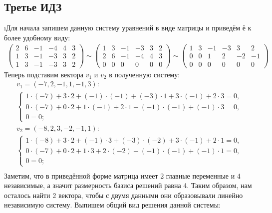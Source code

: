 \subsection{Третье ИДЗ}

\i Для начала запишем данную систему уравнений в виде матрицы и приведём ё к более удобному виду:
\begin{gather*}
    \begin{pmatrix}
        2 & 6 & -1 & -4 & 4 & 3 \\
        1 & 3 & -1 & -3 & 3 & 2 \\
        1 & 3 & -1 & -3 & 3 & 2
    \end{pmatrix} \sim
    \begin{pmatrix}
        1 & 3 & -1 & -3 & 3 & 2 \\
        2 & 6 & -1 & -4 & 4 & 3 \\
        0 & 0 & 0 & 0 & 0 & 0
    \end{pmatrix} \sim 
    \begin{pmatrix}
        1 & 3 & -1 & -3 & 3 & 2 \\
        0 & 0 & 1 & 2 & -2 & -1 \\
        0 & 0 & 0 & 0 & 0 & 0
    \end{pmatrix}
\end{gather*}
Теперь подставим вектора $v_1$ и $v_2$ в полученную систему:
\begin{gather*}
    v_1 = (-7, 2, -1, 1, -1, 3):\\
    \begin{cases}
        1 \cdot (-7) + 3 \cdot 2 + (-1) \cdot (-1) + (-3) \cdot 1 + 3 \cdot (-1) + 2 \cdot 3 = 0,\\
        0 \cdot (-7) + 0 \cdot 2 + 1 \cdot (-1) + 2 \cdot 1 + (-1) \cdot (-1) + (-1) \cdot 3 = 0,\\
        0 = 0; 
    \end{cases}\\
    v_2 = (-8, 2, 3, -2, -1, 1):\\
    \begin{cases}
        1 \cdot (-8) + 3 \cdot 2 + (-1) \cdot 3 + (-3) \cdot (-2) + 3 \cdot (-1) + 2 \cdot 1 = 0,\\
        0 \cdot (-7) + 0 \cdot 2 + 1 \cdot 3 + 2 \cdot (-2) + (-1) \cdot (-1) + (-1) \cdot 1 = 0,\\
        0 = 0; 
    \end{cases}\\
\end{gather*}
Заметим, что в приведённой форме матрица имеет 2 главные переменные и 4 независимые, а значит размерность базиса решений равна 4. Таким образом, нам осталось найти 2 вектора, чтобы с двумя данными они образовывали линейно независимую систему. Выпишем общий вид решения данной системы:
